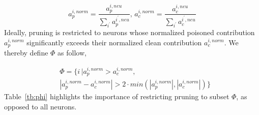 %
\begin{equation}
    a_{p}^{i, norm} = \frac{a_{p}^{i,neu}}{\sum_{i^\prime} a_{p}^{i^\prime,neu}},\, a_{c}^{i, norm} = \frac{a_{c}^{i,neu}}{\sum_{i^\prime} a_{c}^{i^\prime,neu}}
\end{equation}
%
Ideally, pruning is restricted to neurons whose normalized poisoned contribution $a_{p}^{i, norm}$ significantly exceeds their normalized clean contribution $a_{c}^{i, norm}$.
We thereby define $\Phi$ as follow,

%
%

%
\begin{equation}
\begin{split} \label{eq: phi}
    &\Phi = \{i\,| a_{p}^{i, norm} > a_{c}^{i, norm}, \\ 
    &|a_{p}^{i, norm} - a_{c}^{i, norm}|> 2 \cdot min(|a_{p}^{i, norm}|, |a_{c}^{i, norm}|)\} 
\end{split}
\end{equation}
%
Table~\ref{tb:phi} highlights the importance of restricting pruning to subset $\Phi$, as opposed to all neurons.






